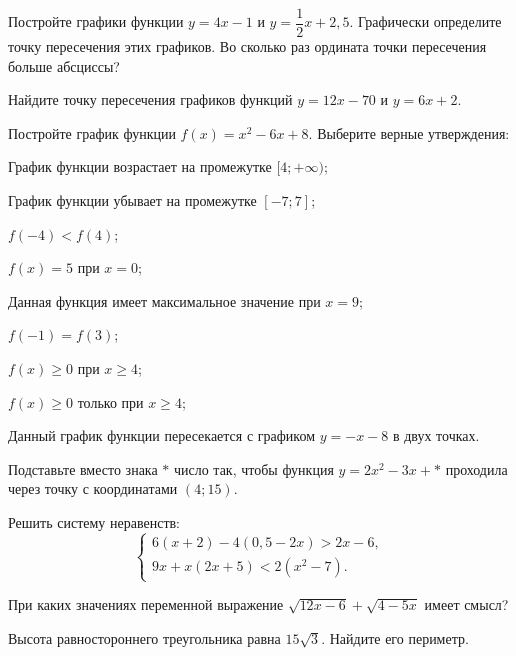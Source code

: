 \begin{class}[number=2]
\begin{listofex}
		\item Постройте графики функции \( y=4x-1 \) и \( y=\dfrac{1}{2}x+2,5 \). Графически определите точку пересечения этих графиков. Во сколько раз ордината точки пересечения больше абсциссы?
		\item Найдите точку пересечения графиков функций \( y=12x-70 \) и \( y=6x+2 \).
		\item Постройте график функции \( f(x)=x^2-6x+8 \). Выберите верные утверждения:
		\begin{enumcols}[itemcolumns=1]
			\item График функции возрастает на промежутке \( [4;+\infty) \);
			\item График функции убывает на промежутке \( [-7;7] \);
			\item \( f(-4)<f(4) \);
			\item \( f(x)=5 \) при \( x=0 \);
			\item Данная функция имеет максимальное значение при \( x=9 \);
			\item \( f(-1)=f(3) \);
			\item \( f(x)\ge0 \) при \( x\ge4 \);
			\item \( f(x)\ge0 \) только при \( x\ge4 \);
			\item Данный график функции пересекается с графиком \( y=-x-8 \) в двух точках.
		\end{enumcols}
		\item Подставьте вместо знака \( * \) число так, чтобы функция \( y=2x^2-3x+* \) проходила через точку с координатами \( (4;15) \).
		\item Решить систему неравенств:
		\[ \left\{
		\begin{array}{l}
			6(x+2)-4(0,5-2x)>2x-6,\\
			9x+x(2x+5)<2(x^2-7).
		\end{array}
		\right. \]
		\item При каких значениях переменной выражение \( \sqrt{12x-6}+\sqrt{4-5x} \) имеет смысл?
		\item {}
		\item {}
		\item Высота равностороннего треугольника равна \( 15\sqrt{3} \). Найдите его периметр.
	\end{listofex}
\end{class}


